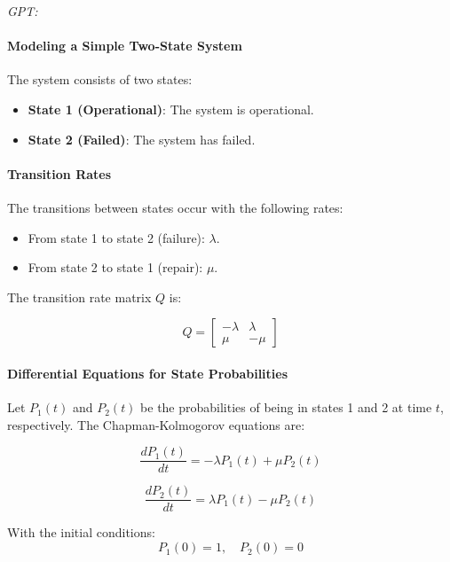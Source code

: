 \documentclass[a4paper,12pt]{article}
\begin{document}
	\begin{answerbox}
		\textit{GPT:}
		\paragraph{Modeling a Simple Two-State System}
		The system consists of two states:
		\begin{itemize}
			\item \textbf{State 1 (Operational)}: The system is operational.
			\item \textbf{State 2 (Failed)}: The system has failed.
		\end{itemize}
		
		\paragraph{Transition Rates}
		The transitions between states occur with the following rates:
		\begin{itemize}
			\item From state 1 to state 2 (failure): \( \lambda \).
			\item From state 2 to state 1 (repair): \( \mu \).
		\end{itemize}
		
		The transition rate matrix \( Q \) is:
		
		\[
		Q = 
		\begin{bmatrix}
			-\lambda & \lambda \\
			\mu & -\mu
		\end{bmatrix}
		\]
		
		\paragraph{Differential Equations for State Probabilities}
		Let \( P_1(t) \) and \( P_2(t) \) be the probabilities of being in states 1 and 2 at time \( t \), respectively. The Chapman-Kolmogorov equations are:
		
		\[
		\frac{dP_1(t)}{dt} = -\lambda P_1(t) + \mu P_2(t)
		\]
		
		\[
		\frac{dP_2(t)}{dt} = \lambda P_1(t) - \mu P_2(t)
		\]
		
		With the initial conditions:
		\[
		P_1(0) = 1, \quad P_2(0) = 0
		\]
	\end{answerbox}
	
\end{document}
